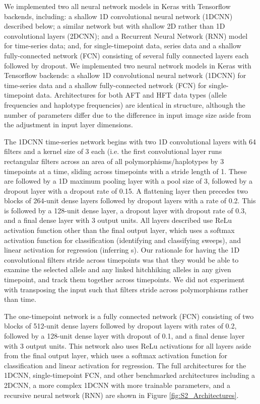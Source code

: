 We implemented two all neural network models in Keras \cite{cholletKeras2015} with Tensorflow backends, including: a shallow 1D convolutional neural network (1DCNN) described below; a similar network but with shallow 2D rather than 1D convolutional layers (2DCNN); and a Recurrent Neural Network (RNN) model for time-series data; and, for single-timepoint data, series data and a shallow fully-connected network (FCN) consisting of several fully connected layers each followed by dropout. We implemented two neural network models in Keras \cite{cholletKeras2015} with Tensorflow backends: a shallow 1D convolutional neural network (1DCNN) for time-series data and a shallow fully-connected network (FCN) for single-timepoint data. Architectures for both AFT and HFT data types (allele frequencies and haplotype frequencies) are identical in structure, although the number of parameters differ due to the difference in input image size aside from the adjustment in input layer dimensions. 

The 1DCNN time-series network begins with two 1D convolutional layers with 64 filters and a kernel size of 3 each (i.e. the first convolutional layer runs rectangular filters across an area of all polymorphisms/haplotypes by 3 timepoints at a time, sliding across timepoints with a stride length of 1. These are followed by a 1D maximum pooling layer with a pool size of 3, followed by a dropout layer with a dropout rate of 0.15. A flattening layer then precedes two blocks of 264-unit dense layers followed by dropout layers with a rate of 0.2. This is followed by a 128-unit dense layer, a dropout layer with dropout rate of 0.3, and a final dense layer with 3 output units. All layers described use ReLu activation function other than the final output layer, which uses a softmax activation function for classification (identifying and classifying sweeps), and linear activation for regression (inferring s). Our rationale for having the 1D convolutional filters stride across timepoints was that they would be able to examine the selected allele and any linked hitchhiking alleles in any given timepoint, and track them together across timepoints. We did not experiment with transposing the input such that filters stride across polymorphisms rather than time. 

The one-timepoint network is a fully connected network (FCN) consisting of two blocks of 512-unit dense layers followed by dropout layers with rates of 0.2, followed by a 128-unit dense layer with dropout of 0.1, and a final dense layer with 3 output units. This network also uses ReLu activations for all layers aside from the final output layer, which uses a softmax activation function for classification and linear activation for regression.
The full architectures for the 1DCNN, single-timepoint FCN, and other benchmarked architectures including a 2DCNN, a more complex 1DCNN with more trainable parameters, and a recursive neural network (RNN) are shown in Figure \ref{fig:S2_Architectures}. \\ 
 
